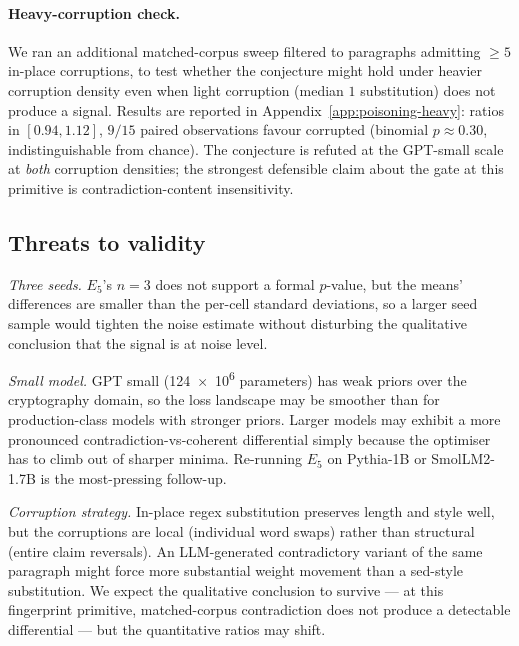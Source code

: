 \documentclass[11pt,a4paper]{article}
\begin{document}
\paragraph{Heavy-corruption check.}  We ran an additional
matched\nobreakdash-corpus sweep filtered to paragraphs admitting
$\geq 5$ in\nobreakdash-place corruptions, to test whether the
conjecture might hold under heavier corruption density even when
light corruption (median $1$ substitution) does not produce a
signal.  Results are reported in
Appendix~\ref{app:poisoning-heavy}: ratios in $[0.94, 1.12]$,
$9/15$ paired observations favour corrupted (binomial
$p \approx 0.30$, indistinguishable from chance).  The
conjecture is refuted at the GPT\nobreakdash-small
scale at \emph{both} corruption densities; the strongest
defensible claim about the gate at this primitive is
contradiction\nobreakdash-content insensitivity.

\subsection{Threats to validity}
\label{sec:poisoning:threats}

\emph{Three seeds.}  $E_5$'s $n = 3$ does not support a formal
$p$\nobreakdash-value, but the means' differences are smaller than
the per\nobreakdash-cell standard deviations, so a larger seed
sample would tighten the noise estimate without disturbing the
qualitative conclusion that the signal is at noise level.

\emph{Small model.}  GPT small (\num{124e6}
parameters) has weak priors over the cryptography domain, so the
loss landscape may be smoother than for production\nobreakdash-class
models with stronger priors.  Larger models may exhibit a more
pronounced contradiction\nobreakdash-vs\nobreakdash-coherent
differential simply because the optimiser has to climb out of
sharper minima.  Re\nobreakdash-running $E_5$ on Pythia\nobreakdash-1B
or SmolLM2\nobreakdash-1.7B is the most\nobreakdash-pressing
follow\nobreakdash-up.

\emph{Corruption strategy.}  In\nobreakdash-place regex substitution
preserves length and style well, but the corruptions are local
(individual word swaps) rather than structural (entire claim
reversals).  An LLM\nobreakdash-generated contradictory variant of
the same paragraph might force more substantial weight movement
than a sed\nobreakdash-style substitution.  We expect the
qualitative conclusion to survive — at this fingerprint primitive,
matched\nobreakdash-corpus contradiction does not produce a
detectable differential — but the quantitative ratios may shift.
\end{document}

